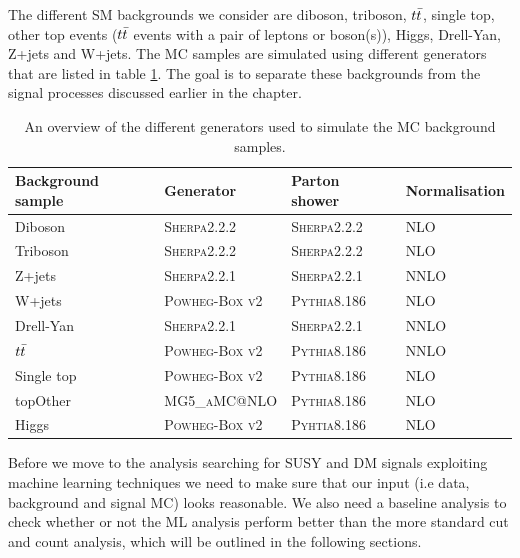 The different SM backgrounds we consider are diboson, triboson, $t\Bar{t}$, single top, other top events ($t\Bar{t}$ events with a pair of leptons or boson(s)), Higgs, Drell-Yan, Z+jets and W+jets. The MC samples are simulated using different generators that are listed in table \ref{tab:bkg_samples}. The goal is to separate these backgrounds from the signal processes discussed earlier in the chapter. 

\begin{table}[H]
    \centering
    \begin{tabular}{l l l l} \toprule
        \textbf{Background sample} & \textbf{Generator} & \textbf{Parton shower} & \textbf{Normalisation}\\
        \midrule
        \midrule
        Diboson & \textsc{Sherpa2.2.2}\cite{sherpa2_1, sherpa1_2, sherpa1_3} & \textsc{Sherpa2.2.2} & NLO \cite{NLO}\\
        Triboson & \textsc{Sherpa2.2.2} & \textsc{Sherpa2.2.2} & NLO \\
        Z+jets & \textsc{Sherpa2.2.1} \cite{sherpa1_1, sherpa1_2, sherpa1_3} & \textsc{Sherpa2.2.1} & NNLO \cite{NNLO}\\
        W+jets & \textsc{Powheg-Box v2}\cite{49Z, 50Z} & \textsc{Pythia8.186} \cite{49} & NLO\\
        Drell-Yan & \textsc{Sherpa2.2.1} & \textsc{Sherpa2.2.1} & NNLO\\
        $t\Bar{t}$ & \textsc{Powheg-Box v2} & \textsc{Pythia8.186} & NNLO\\
        Single top & \textsc{Powheg-Box v2} & \textsc{Pythia8.186} & NLO\\
        topOther & \textsc{MG5\_aMC@NLO} \cite{48} & \textsc{Pythia8.186} & NLO\\
        Higgs & \textsc{Powheg-Box v2} & \textsc{Pyhtia8.186} & NLO\\
        \bottomrule
    \end{tabular}
    \caption{An overview of the different generators used to simulate the MC background samples.}
    \label{tab:bkg_samples}
\end{table}

Before we move to the analysis searching for SUSY and DM signals exploiting machine learning techniques we need to make sure that our input (i.e data, background and signal MC) looks reasonable. We also need a baseline analysis to check whether or not the ML analysis perform better than the more standard cut and count analysis, which will be outlined in the following sections.


